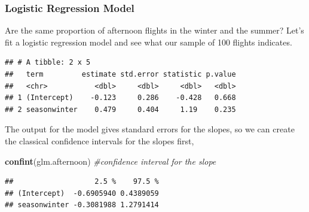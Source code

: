 \documentclass[
]{book}
\newenvironment{Shaded}{\begin{snugshade}}{\end{snugshade}}
\newcommand{\CommentTok}[1]{\textcolor[rgb]{0.56,0.35,0.01}{\textit{#1}}}
\newcommand{\DataTypeTok}[1]{\textcolor[rgb]{0.13,0.29,0.53}{#1}}
\newcommand{\KeywordTok}[1]{\textcolor[rgb]{0.13,0.29,0.53}{\textbf{#1}}}
\newcommand{\NormalTok}[1]{#1}
\newcommand{\OperatorTok}[1]{\textcolor[rgb]{0.81,0.36,0.00}{\textbf{#1}}}
\newcommand{\StringTok}[1]{\textcolor[rgb]{0.31,0.60,0.02}{#1}}
\begin{document}
\hypertarget{logistic-regression-model}{%
\subsubsection{Logistic Regression Model}\label{logistic-regression-model}}

Are the same proportion of afternoon flights in the winter and the summer? Let's fit a logistic regression model and see what our sample of 100 flights indicates.

\begin{Shaded}
\end{Shaded}

\begin{verbatim}
## # A tibble: 2 x 5
##   term         estimate std.error statistic p.value
##   <chr>           <dbl>     <dbl>     <dbl>   <dbl>
## 1 (Intercept)    -0.123     0.286    -0.428   0.668
## 2 seasonwinter    0.479     0.404     1.19    0.235
\end{verbatim}

The output for the model gives standard errors for the slopes, so we can create the classical confidence intervals for the slopes first,

\begin{Shaded}
\begin{Highlighting}[]
\KeywordTok{confint}\NormalTok{(glm.afternoon) }\CommentTok{#confidence interval for the slope}
\end{Highlighting}
\end{Shaded}

\begin{verbatim}
##                   2.5 %    97.5 %
## (Intercept)  -0.6905940 0.4389059
## seasonwinter -0.3081988 1.2791414
\end{verbatim}
\end{document}
